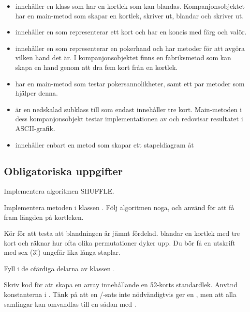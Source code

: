 \begin{itemize}
\item {} innehåller en klass som har en kortlek som kan blandas. Kompanjonsobjektet har en main-metod som skapar en kortlek, skriver ut, blandar och skriver ut.
\item {} innehåller en  som representerar ett kort och har en koncis  med färg  och valör.
\item {} innehåller en  som representerar en pokerhand och har metoder för att avgöra vilken hand det är. I kompanjonsobjektet finns en fabriksmetod som kan skapa en hand genom att dra fem kort från en kortlek.
\item {} har en main-metod som testar pokersannolikheter, samt ett par metoder som hjälper denna.
\item {} är en nedskalad subklass till  som endast innehåller tre kort. Main-metoden i dess kompanjonsobjekt testar implementationen av  och redovisar resultatet i ASCII-grafik.
\item {} innehåller enbart en metod som skapar ett stapeldiagram åt 
\end{itemize}

\ifkompendium
\clearpage
\fi


\subsection{Obligatoriska uppgifter}\label{subsection:lab:shuffle:tasks}

\Task Implementera algoritmen SHUFFLE.

\Subtask Implementera metoden  i klassen . Följ algoritmen noga, och använd  för att få fram längden på kortleken.

\Subtask Kör  för att testa att blandningen är jämnt fördelad.  blandar en kortlek med tre kort och räknar hur ofta olika permutationer dyker upp. Du bör få en utskrift med sex ($3!$) ungefär lika långa staplar.

\Task Fyll i de ofärdiga delarna av klassen .

\Subtask Skriv kod för att skapa en array innehållande en 52-korts standardlek. Använd konstanterna i . Tänk på att en /-sats inte nödvändigtvis ger en , men att alla samlingar kan omvandlas till en sådan med .

